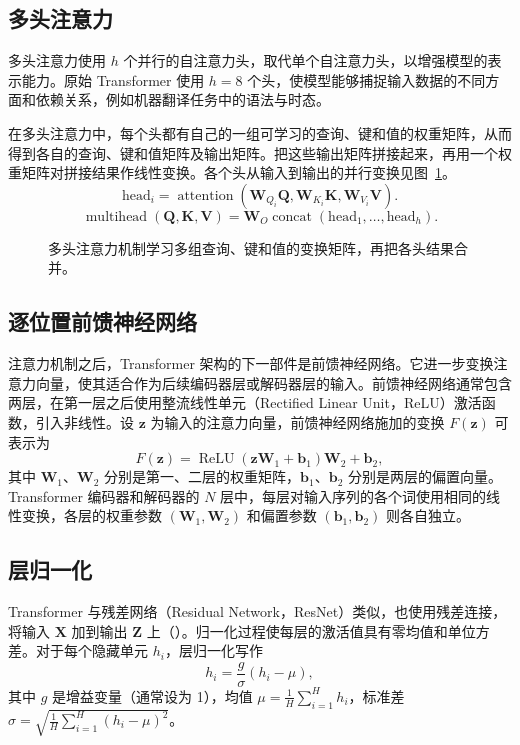 \subsection{多头注意力}
多头注意力使用 $h$ 个并行的自注意力头，取代单个自注意力头，以增强模型的表示能力。原始 Transformer 使用 $h=8$ 个头，使模型能够捕捉输入数据的不同方面和依赖关系，例如机器翻译任务中的语法与时态。

在多头注意力中，每个头都有自己的一组可学习的查询、键和值的权重矩阵，从而得到各自的查询、键和值矩阵及输出矩阵。把这些输出矩阵拼接起来，再用一个权重矩阵对拼接结果作线性变换。各个头从输入到输出的并行变换见图~\ref{fig:ch02-multihead}。
\begin{equation}
\mathrm{head}_i
=\operatorname{attention}(\symbf{W}_{Q_i}\symbf{Q},\symbf{W}_{K_i}\symbf{K},\symbf{W}_{V_i}\symbf{V}).
\tag{2.15}
\end{equation}
\begin{equation}
\operatorname{multihead}(\symbf{Q},\symbf{K},\symbf{V})
=\symbf{W}_O\operatorname{concat}(\mathrm{head}_1,\ldots,\mathrm{head}_h).
\tag{2.16}
\end{equation}

\begin{figure}[!htbp]
\centering

\caption{多头注意力机制学习多组查询、键和值的变换矩阵，再把各头结果合并。}
\label{fig:ch02-multihead}
\end{figure}

\subsection{逐位置前馈神经网络}
注意力机制之后，Transformer 架构的下一部件是前馈神经网络。它进一步变换注意力向量，使其适合作为后续编码器层或解码器层的输入。前馈神经网络通常包含两层，在第一层之后使用整流线性单元（Rectified Linear Unit，ReLU）激活函数，引入非线性。设 $\symbf{z}$ 为输入的注意力向量，前馈神经网络施加的变换 $F(\symbf{z})$ 可表示为
\begin{equation}
F(\symbf{z})=\operatorname{ReLU}(\symbf{z}\symbf{W}_1+\symbf{b}_1)\symbf{W}_2+\symbf{b}_2,
\tag{2.17}
\end{equation}
其中 $\symbf{W}_1$、$\symbf{W}_2$ 分别是第一、二层的权重矩阵，$\symbf{b}_1$、$\symbf{b}_2$ 分别是两层的偏置向量。Transformer 编码器和解码器的 $N$ 层中，每层对输入序列的各个词使用相同的线性变换，各层的权重参数 $(\symbf{W}_1,\symbf{W}_2)$ 和偏置参数 $(\symbf{b}_1,\symbf{b}_2)$ 则各自独立。

\subsection{层归一化}
Transformer 与残差网络（Residual Network，ResNet）类似，也使用残差连接，将输入 $\symbf{X}$ 加到输出 $\symbf{Z}$ 上（）。归一化过程使每层的激活值具有零均值和单位方差。对于每个隐藏单元 $h_i$，层归一化写作
\begin{equation}
h_i=\frac{g}{\sigma}(h_i-\mu),
\tag{2.18}
\end{equation}
其中 $g$ 是增益变量（通常设为 1），均值 $\mu=\frac{1}{H}\sum_{i=1}^{H}h_i$，标准差 $\sigma=\sqrt{\frac{1}{H}\sum_{i=1}^{H}(h_i-\mu)^2}$。

